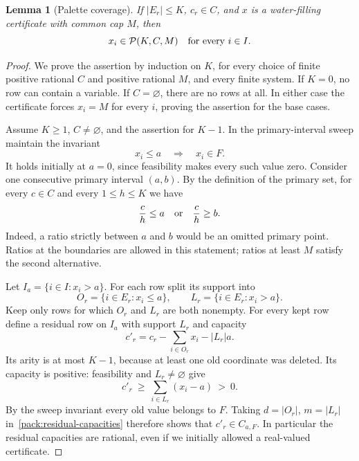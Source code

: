 \documentclass[11pt,a4paper]{article}
\newtheorem{lemma}[lemma]{Lemma}
\theoremstyle{definition}
\theoremstyle{remark}
\begin{document}
\begin{lemma}[Palette coverage]\label{pack:coverage}
If $|E_r|\leq K$, $c_r\in C$, and $x$ is a water-filling certificate
with common cap $M$, then
\[
 x_i\in\mathcal P(K,C,M)\quad\hbox{for every }i\in I.
\]
\end{lemma}
\begin{proof}
We prove the assertion by induction on $K$, for every choice of finite
positive rational $C$ and positive rational $M$, and every finite system.
If $K=0$, no row can contain a variable.  If $C=\varnothing$, there are
no rows at all.  In either case the certificate forces $x_i=M$ for every
$i$, proving the assertion for the base cases.

Assume $K\geq1$, $C\ne\varnothing$, and the assertion for $K-1$.
In the primary-interval sweep maintain the invariant
\begin{equation}\label{pack:sweep-invariant}
 x_i\leq a\quad\Longrightarrow\quad x_i\in F.
\end{equation}
It holds initially at $a=0$, since feasibility makes every such value
zero.  Consider one consecutive primary interval $(a,b)$.  By the
definition of the primary set, for every $c\in C$ and every
$1\leq h\leq K$ we have
\begin{equation}\label{pack:gap}
 \frac{c}{h}\leq a\quad\hbox{or}\quad\frac{c}{h}\geq b.
\end{equation}
Indeed, a ratio strictly between $a$ and $b$ would be an omitted primary
point.  Ratios at the boundaries are allowed in this statement; ratios
at least $M$ satisfy the second alternative.

Let $I_a=\{i\in I:x_i>a\}$.  For each row split its support into
\[
 O_r=\{i\in E_r:x_i\leq a\},
 \qquad L_r=\{i\in E_r:x_i>a\}.
\]
Keep only rows for which $O_r$ and $L_r$ are both nonempty.  For every
kept row define a residual row on $I_a$ with support $L_r$ and capacity
\begin{equation}\label{pack:residual-row}
 c'_r=c_r-\sum_{i\in O_r}x_i-|L_r|a.
\end{equation}
Its arity is at most $K-1$, because at least one old coordinate was
deleted.  Its capacity is positive: feasibility and $L_r\ne\varnothing$
give
\[
 c'_r\ \geq\ \sum_{i\in L_r}(x_i-a)\ >\ 0.
\]
By the sweep invariant every old value belongs to $F$.  Taking
$d=|O_r|$, $m=|L_r|$ in~\eqref{pack:residual-capacities} therefore
shows that $c'_r\in C_{a,F}$.  In particular the residual capacities
are rational, even if we initially allowed a real-valued certificate.


\end{proof}
\end{document}
